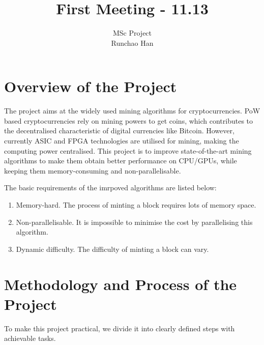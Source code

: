 \documentclass[11pt]{article}
\begin{document}
\title{First Meeting - 11.13}
\author{MSc Project \\
Runchao Han \\
}
\maketitle
%
%
\section{Overview of the Project}

The project aims at the widely used mining algorithms for cryptocurrencies. PoW based cryptocurrencies rely on mining powers to get coins, which contributes to the decentralised characteristic of digital currencies like Bitcoin. However, currently ASIC and FPGA technologies are utilised for mining, making the computing power centralised. This project is to improve state-of-the-art mining algorithms to make them obtain better performance on CPU/GPUs, while keeping them memory-consuming and non-parallelisable.

The basic requirements of the imrpoved algorithms are listed below:
\begin{enumerate}
\item Memory-hard. The process of minting a block requires lots of memory space.
\item Non-parallelisable. It is impossible to minimise the cost by parallelising this algorithm.
\item Dynamic difficulty. The difficulty of minting a block can vary.
\end{enumerate}
%
%
\section{Methodology and Process of the Project}

To make this project practical, we divide it into clearly defined steps with achievable tasks.
\end{document}
